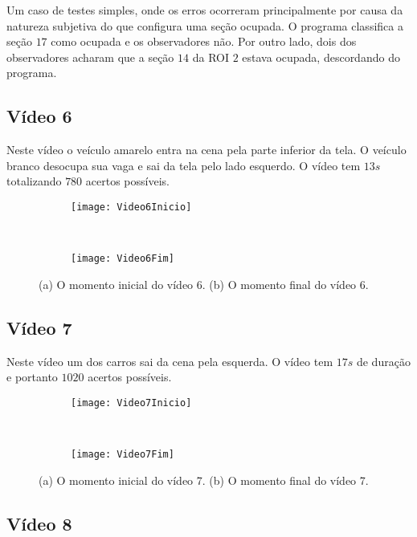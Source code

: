 Um caso de testes simples, onde os erros ocorreram principalmente por causa da natureza subjetiva do que configura uma seção ocupada. O programa classifica a seção $17$ como ocupada e os observadores não. Por outro lado, dois dos observadores acharam que a seção $14$ da ROI $2$ estava ocupada, descordando do programa.

\subsection{Vídeo 6}

Neste vídeo o veículo amarelo entra na cena pela parte inferior da tela. O veículo branco desocupa sua vaga e sai da tela pelo lado esquerdo. O vídeo tem $13s$ totalizando $780$ acertos possíveis.

\begin{figure}[!h]
\centering
\begin{subfigure}{.5\textwidth}
\centering
\texttt{[image: Video6Inicio]}
\caption{}
\end{subfigure}\
\begin{subfigure}{.5\textwidth}
\centering
\texttt{[image: Video6Fim]}
\caption{}
\end{subfigure}
\centering
\caption{(a) O momento inicial do vídeo 6. (b) O momento final do vídeo 6.}%
\label{}%
\end{figure}

\subsection{Vídeo 7}

Neste vídeo um dos carros sai da cena pela esquerda. O vídeo tem $17s$ de duração e portanto $1020$ acertos possíveis.

\begin{figure}[!h]
\centering
\begin{subfigure}{.5\textwidth}
\centering
\texttt{[image: Video7Inicio]}
\caption{}
\end{subfigure}\
\begin{subfigure}{.5\textwidth}
\centering
\texttt{[image: Video7Fim]}
\caption{}
\end{subfigure}
\centering
\caption{(a) O momento inicial do vídeo 7. (b) O momento final do vídeo 7.}%
\label{}%
\end{figure}

\subsection{Vídeo 8}

